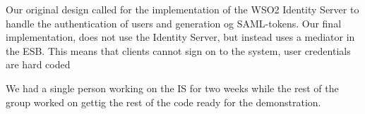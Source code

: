 Our original design called for the implementation of the WSO2 Identity Server to handle the authentication of users and generation og SAML-tokens.
Our final implementation, does not use the Identity Server, but instead uses a mediator in the ESB. This means that clients cannot sign on to the system, user credentials are hard coded 

We had a single person working on the IS for two weeks while the rest of the group worked on gettig the rest of the code ready for the demonstration. 
